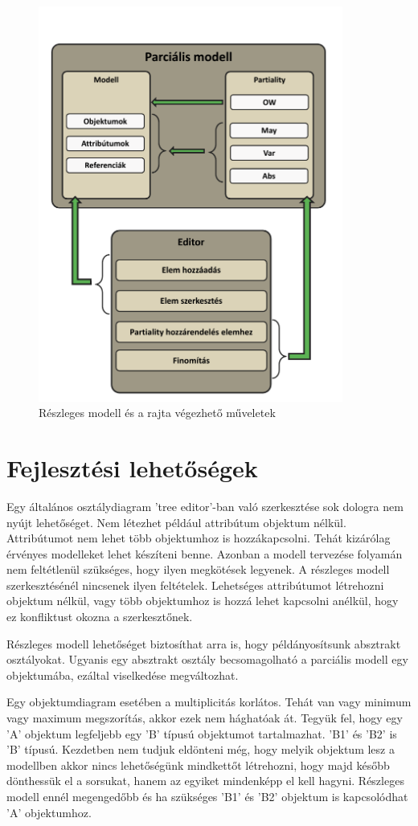 \begin{figure}[!ht]
	\centering
	\includegraphics[width=100mm]{figures/overview.pdf}
	\caption{Részleges modell és a rajta végezhető műveletek} 
	\label{overview}
\end{figure}


\section{Fejlesztési lehetőségek}
Egy általános osztálydiagram 'tree editor'-ban való szerkesztése sok dologra nem nyújt lehetőséget. 
Nem létezhet például attribútum objektum nélkül. Attribútumot nem lehet több objektumhoz is hozzákapcsolni. Tehát kizárólag érvényes modelleket lehet készíteni benne. Azonban a modell tervezése folyamán nem feltétlenül szükséges, hogy ilyen megkötések legyenek. A részleges modell szerkesztésénél nincsenek ilyen feltételek. Lehetséges attribútumot létrehozni objektum nélkül, vagy több objektumhoz is hozzá lehet kapcsolni anélkül, hogy ez konfliktust okozna a szerkesztőnek.
\par
Részleges modell lehetőséget biztosíthat arra is, hogy példányosítsunk absztrakt osztályokat. Ugyanis egy absztrakt osztály becsomagolható a parciális modell egy objektumába, ezáltal viselkedése megváltozhat. 
\par
Egy objektumdiagram esetében a multiplicitás korlátos. Tehát van vagy minimum vagy maximum megszorítás, akkor ezek nem hághatóak át. Tegyük fel, hogy egy 'A' objektum legfeljebb egy 'B' típusú objektumot tartalmazhat. 'B1' és 'B2' is 'B' típusú. Kezdetben nem tudjuk eldönteni még, hogy melyik objektum lesz a modellben akkor nincs lehetőségünk mindkettőt létrehozni, hogy majd később dönthessük el a sorsukat, hanem az egyiket mindenképp el kell hagyni. Részleges modell ennél megengedőbb és ha szükséges 'B1' és 'B2' objektum is kapcsolódhat 'A' objektumhoz.

